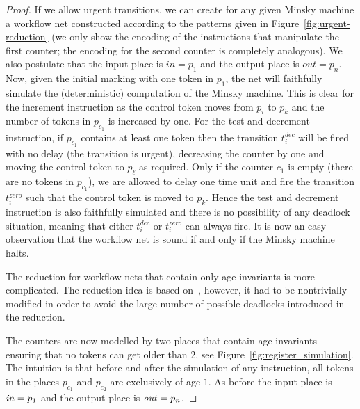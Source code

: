 \begin{proof}
If we allow urgent transitions, we can create for any given Minsky machine
a workflow net constructed according to the patterns given in Figure~\ref{fig:urgent-reduction} (we only show
the encoding of the instructions that manipulate the first counter;
the encoding for the second counter is completely analogous).
We also postulate that the input place is $in=p_1$ and the output place is
$out=p_n$. Now, given the initial marking with one token in $p_1$,
the net will faithfully simulate the (deterministic) computation of
the Minsky machine. This is clear for the increment instruction
as the control token moves from $p_i$ to $p_k$ and the number of tokens
in $p_{c_1}$ is increased by one. For the test and decrement instruction,
if $p_{c_1}$ contains at least one token then the transition
$t_i^{\mathit{dec}}$ will be fired with no delay (the transition is urgent),
decreasing the counter by one and moving the control token to $p_\ell$
as required. Only if the counter $c_1$ is empty (there are no tokens
in $p_{c_1}$), we are allowed to delay one time unit and fire the transition
$t_i^{\mathit{zero}}$ such that the control token is moved to $p_k$.
Hence the test and decrement instruction is also faithfully simulated
and there is no possibility of any deadlock situation, meaning that
either $t_i^{\mathit{dec}}$ or $t_i^{\mathit{zero}}$ can always fire.
It is now an easy observation that the workflow net is sound if and only
if the Minsky machine halts.


The reduction for workflow nets that contain only age invariants
is more complicated. The reduction idea is based on~\cite{memics_paper}, 
however, it had to be nontrivially modified in order to avoid the
large number of possible deadlocks introduced in the reduction.

The counters are now modelled by two places that contain age invariants
ensuring that no tokens can get older than $2$, see 
Figure~\ref{fig:register_simulation}. The intuition is that
before and after the simulation of any instruction, all tokens in
the places $p_{c_1}$ and $p_{c_2}$ are exclusively of age $1$. 
As before the input place is ${\mathit{in}}=p_1$ and the output place
is ${\mathit{out}}=p_n$.


\end{proof}
